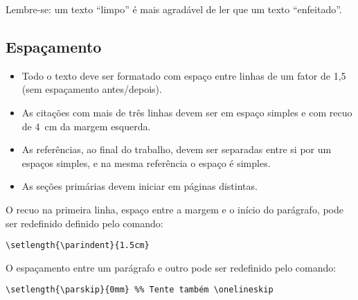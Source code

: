 \noindent Lembre-se: um texto ``limpo'' é mais agradável de ler que um texto ``enfeitado''.

\subsection{Espaçamento}\label{sec:espacamento}

\begin{itemize}%
    \item Todo o texto deve ser formatado com espaço entre linhas de um fator de 1,5 (sem espaçamento antes/depois).
    \item As citações com mais de três linhas devem ser em espaço simples e com recuo de \SI{4}{cm} da margem esquerda.
    \item As referências, ao final do trabalho, devem ser separadas entre si por um espaços simples, e na mesma referência o espaço é simples.
    \item As seções primárias devem iniciar em páginas distintas.
\end{itemize}

O recuo na primeira linha, espaço entre a margem e o início do parágrafo, pode ser redefinido definido pelo comando:

\begin{SingleSpacing}%
    \begin{verbatim}
\setlength{\parindent}{1.5cm}
\end{verbatim}
\end{SingleSpacing}

O espaçamento entre um parágrafo e outro pode ser redefinido pelo comando:

\begin{SingleSpacing}%
    \begin{verbatim}
\setlength{\parskip}{0mm} %% Tente também \onelineskip
\end{verbatim}
\end{SingleSpacing}

